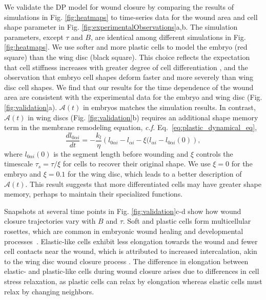 \documentclass[%
 reprint,
superscriptaddress,
amsmath,amssymb,
prl,
floatfix,
]{revtex4-2}
\begin{document}
We validate the DP model for wound closure by comparing the results of simulations in Fig. \ref{fig:heatmaps} to time-series data for the wound area and cell shape parameter in Fig. \ref{fig:experimentalObservations}a,b. The simulation parameters, except $\tau$ and $B$, are identical among different simulations in Fig. \ref{fig:heatmaps}. We use softer and more plastic cells to model the embryo (red square) than the wing disc (black square). This choice reflects the expectation that cell stiffness increases with greater degree of cell differentiation \cite{guimaraes2020stiffness, molnar2021plastic}, and the observation that embryo cell shapes deform faster and more severely than wing disc cell shapes. We find that our results for the time dependence of the wound area are consistent with the experimental data for the embryo and wing disc (Fig. \ref{fig:validation}a). $\mathcal{A}(t)$ in embryos matches the simulation results. In contrast,  $\mathcal{A}(t)$ in wing discs (Fig. \ref{fig:validation}b) requires an additional shape memory term in the membrane remodeling equation, {\it c.f.} Eq.~\ref{eq:plastic_dynamical_eq}, 
\begin{equation}
    \label{eq:tau_s}
    \frac{dl_{0\alpha i}}{dt} = -\frac{k_l}{\eta}\left(l_{0\alpha i}-l_{\alpha i} - \xi(l_{\alpha i} - l_{0\alpha i}(0)\right),
\end{equation}
where $l_{0\alpha i}(0)$ is the segment length before wounding and $\xi$ controls the timescale $\tau_s = \tau/\xi$ for cells to recover their original shape. We use $\xi=0$ for the embryo and $\xi = 0.1$ for the wing disc, which leads to a better description of $\mathcal{A}(t)$. This result suggests that more differentiated cells may have greater shape memory, perhaps to maintain their specialized functions.

Snapshots at several time points in Fig. \ref{fig:validation}c-d show how wound closure trajectories vary with $B$ and $\tau$. Soft and plastic cells form multicellular rosettes, which are common in embryonic wound healing and developmental processes~\cite{wood2002wound, tetley2019tissue, harding2014roles}. Elastic-like cells exhibit less elongation towards the wound and fewer cell contacts near the wound, which is attributed to increased intercalation, akin to the wing disc wound closure process \cite{tetley2019tissue}. The difference in elongation between elastic- and plastic-like cells during wound closure arises due to differences in cell stress relaxation, as plastic cells can relax by elongation whereas elastic cells must relax by changing neighbors.
\end{document}
